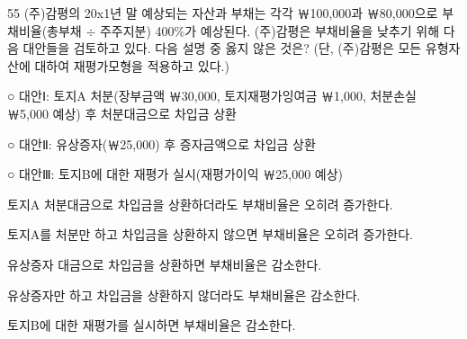 \begin{question}{55}
(주)감평의 20x1년 말 예상되는 자산과 부채는 각각 ￦100,000과 ￦80,000으로 부채비율(총부채 $÷$ 주주지분) 400\%가 예상된다. (주)감평은 부채비율을 낮추기 위해 다음 대안들을 검토하고 있다. 다음 설명 중 옳지 않은 것은? (단, (주)감평은 모든 유형자산에 대하여 재평가모형을 적용하고 있다.)
\begin{framedtext}
○ 대안Ⅰ: 토지A 처분(장부금액 ￦30,000, 토지재평가잉여금 ￦1,000, 처분손실 ￦5,000 예상) 후 처분대금으로 차입금 상환 \par
○ 대안Ⅱ: 유상증자(￦25,000) 후 증자금액으로 차입금 상환 \par
○ 대안Ⅲ: 토지B에 대한 재평가 실시(재평가이익 ￦25,000 예상) \par
\end{framedtext}
\begin{choices}
  \item 토지A 처분대금으로 차입금을 상환하더라도 부채비율은 오히려 증가한다.
  \item 토지A를 처분만 하고 차입금을 상환하지 않으면 부채비율은 오히려 증가한다.
  \item 유상증자 대금으로 차입금을 상환하면 부채비율은 감소한다.
  \item 유상증자만 하고 차입금을 상환하지 않더라도 부채비율은 감소한다.
  \item 토지B에 대한 재평가를 실시하면 부채비율은 감소한다.
\end{choices}
\end{question}

